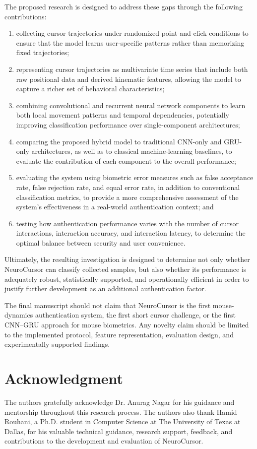 \documentclass[conference]{IEEEtran}
\begin{document}
The proposed research is designed to address these gaps through the following contributions:

\begin{enumerate}
    \item collecting cursor trajectories under randomized point-and-click conditions to ensure that the model learns user-specific patterns rather than memorizing fixed trajectories;
    \item representing cursor trajectories as multivariate time series that include both raw positional data and derived kinematic features, allowing the model to capture a richer set of behavioral characteristics;
    \item combining convolutional and recurrent neural network components to learn both local movement patterns and temporal dependencies, potentially improving classification performance over single-component architectures;
    \item comparing the proposed hybrid model to traditional CNN-only and GRU-only architectures, as well as to classical machine-learning baselines, to evaluate the contribution of each component to the overall performance;
    \item evaluating the system using biometric error measures such as false acceptance rate, false rejection rate, and equal error rate, in addition to conventional classification metrics, to provide a more comprehensive assessment of the system's effectiveness in a real-world authentication context; and
    \item testing how authentication performance varies with the number of cursor interactions, interaction accuracy, and interaction latency, to determine the optimal balance between security and user convenience.
\end{enumerate}

Ultimately, the resulting investigation is designed to determine not only whether NeuroCursor can classify collected samples, but also whether its performance is adequately robust, statistically supported, and operationally efficient in order to justify further development as an additional authentication factor.

The final manuscript should not claim that NeuroCursor is the first mouse-dynamics authentication system, the first short cursor challenge, or the first CNN--GRU approach for mouse biometrics. Any novelty claim should be limited to the implemented protocol, feature representation, evaluation design, and experimentally supported findings. 

\section*{Acknowledgment}
The authors gratefully acknowledge Dr. Anurag Nagar for his guidance and mentorship throughout this research process. The authors also thank Hamid Rouhani, a Ph.D. student in Computer Science at The University of Texas at Dallas, for his valuable technical guidance, research support, feedback, and contributions to the development and evaluation of NeuroCursor. 



\end{document}
